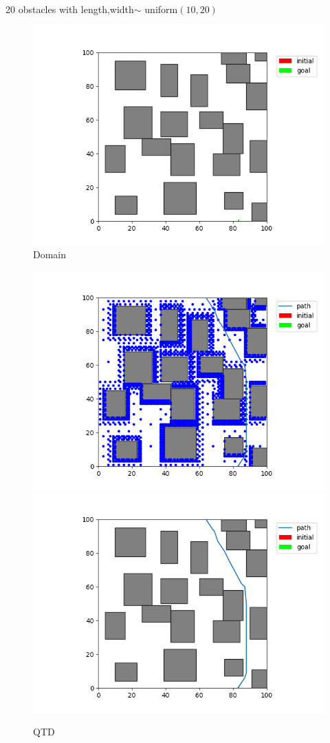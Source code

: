\documentclass[12pt,a4paper]{article}
\begin{document}
20 obstacles with length,width$\sim$ uniform$(10,20)$\\
\begin{figure}[H]
\centering
	\includegraphics[scale=.40]{20_20_emp}
\caption{Domain}
\end{figure}

\begin{figure}[H]
\centering
	\includegraphics[scale=.40]{20_20_qtd_state}
    \includegraphics[scale=.40]{20_20_qtd_path}
\caption{QTD}
\end{figure}
\end{document}
